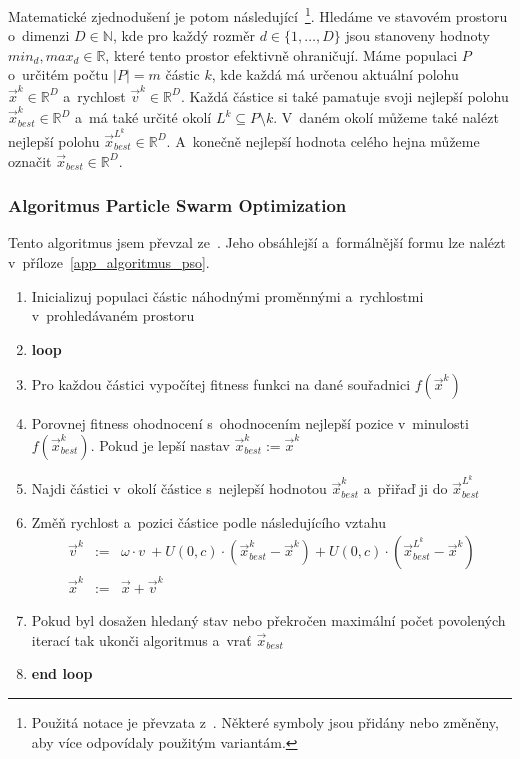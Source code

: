 \documentclass[12pt,a4paper,fleqn]{article}
\begin{document}
Matematické zjednodušení je potom následující~\footnote{Použitá notace je převzata z~\cite{sfc08}. Některé symboly jsou přidány nebo změněny, aby více odpovídaly použitým variantám.}. Hledáme ve stavovém prostoru o~dimenzi $D \in \mathbb{N}$, kde pro každý rozměr $d \in \{1,\dots,D\}$ jsou stanoveny hodnoty $min_d, max_d \in \mathbb{R}$, které tento prostor efektivně ohraničují. Máme populaci $P$ o~určitém počtu $|P| = m$ částic $k$, kde každá má určenou aktuální polohu $\vec{x}^k \in \mathbb{R}^D$ a~rychlost $\vec{v}^k \in \mathbb{R}^D$. Každá částice si také pamatuje svoji nejlepší polohu $\vec{x}^k_{best} \in \mathbb{R}^D$ a~má také určité okolí $L^k \subseteq P \setminus k$. V~daném okolí můžeme také nalézt nejlepší polohu $\vec{x}^{L^k}_{best} \in \mathbb{R}^D$. A~konečně nejlepší hodnota celého hejna můžeme označit $\vec{x}_{best} \in \mathbb{R}^D$.

\subsubsection*{Algoritmus Particle Swarm Optimization} \label{algoritmus_pso}
Tento algoritmus jsem převzal ze~\cite{poli2007particle}. Jeho obsáhlejší a~formálnější formu lze nalézt v~příloze~\ref{app_algoritmus_pso}.
\begin{enumerate}
\item Inicializuj populaci částic náhodnými proměnnými a~rychlostmi v~prohledávaném prostoru
\item \textbf{loop}
\item Pro každou částici vypočítej fitness funkci na dané souřadnici $f(\vec{x}^k)$
\item Porovnej fitness ohodnocení s~ohodnocením nejlepší pozice v~minulosti $f(\vec{x}^k_{best})$. Pokud je lepší nastav $\vec{x}^k_{best} := \vec{x}^k$
\item Najdi částici v~okolí částice s~nejlepší hodnotou $\vec{x}^k_{best}$ a~přiřaď ji do $\vec{x}^{L^k}_{best}$
\item Změň rychlost a~pozici částice podle následujícího vztahu
\begin{eqnarray} 
\vec{v}^k & := & \omega \cdot v~+ U(0,c) \cdot (\vec{x}^k_{best} - \vec{x}^k) + U(0,c) \cdot (\vec{x}^{L^k}_{best} -  \vec{x}^k) \label{v-algoritmus}\\
\vec{x}^k & := & \vec{x} + \vec{v}^k
\end{eqnarray}
\item Pokud byl dosažen hledaný stav nebo překročen maximální počet povolených iterací tak ukonči algoritmus a~vrať $\vec{x}_{best}$
\item \textbf{end loop}
\end{enumerate}
\end{document}
